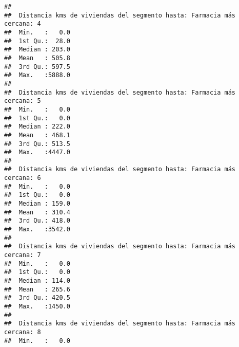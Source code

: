 \documentclass[11pt,]{article}
\begin{document}
\begin{verbatim}
##                                                                        
##  Distancia kms de viviendas del segmento hasta: Farmacia más cercana: 4
##  Min.   :   0.0                                                        
##  1st Qu.:  28.0                                                        
##  Median : 203.0                                                        
##  Mean   : 505.8                                                        
##  3rd Qu.: 597.5                                                        
##  Max.   :5888.0                                                        
##                                                                        
##  Distancia kms de viviendas del segmento hasta: Farmacia más cercana: 5
##  Min.   :   0.0                                                        
##  1st Qu.:   0.0                                                        
##  Median : 222.0                                                        
##  Mean   : 468.1                                                        
##  3rd Qu.: 513.5                                                        
##  Max.   :4447.0                                                        
##                                                                        
##  Distancia kms de viviendas del segmento hasta: Farmacia más cercana: 6
##  Min.   :   0.0                                                        
##  1st Qu.:   0.0                                                        
##  Median : 159.0                                                        
##  Mean   : 310.4                                                        
##  3rd Qu.: 418.0                                                        
##  Max.   :3542.0                                                        
##                                                                        
##  Distancia kms de viviendas del segmento hasta: Farmacia más cercana: 7
##  Min.   :   0.0                                                        
##  1st Qu.:   0.0                                                        
##  Median : 114.0                                                        
##  Mean   : 265.6                                                        
##  3rd Qu.: 420.5                                                        
##  Max.   :1450.0                                                        
##                                                                        
##  Distancia kms de viviendas del segmento hasta: Farmacia más cercana: 8
##  Min.   :   0.0                                                        

\end{verbatim}
\end{document}
